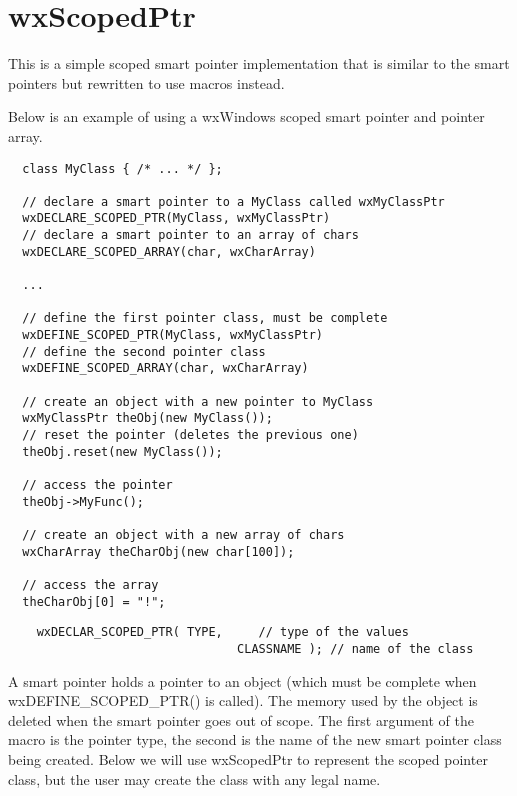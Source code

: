 \section{wxScopedPtr}\label{wxscopedptr}

This is a simple scoped smart pointer implementation that is similar to 
the  smart pointers but rewritten to
use macros instead.


Below is an example of using a wxWindows scoped smart pointer and 
pointer array.

\begin{verbatim}
  class MyClass { /* ... */ };

  // declare a smart pointer to a MyClass called wxMyClassPtr
  wxDECLARE_SCOPED_PTR(MyClass, wxMyClassPtr)
  // declare a smart pointer to an array of chars
  wxDECLARE_SCOPED_ARRAY(char, wxCharArray)

  ...

  // define the first pointer class, must be complete
  wxDEFINE_SCOPED_PTR(MyClass, wxMyClassPtr)
  // define the second pointer class
  wxDEFINE_SCOPED_ARRAY(char, wxCharArray)

  // create an object with a new pointer to MyClass
  wxMyClassPtr theObj(new MyClass());
  // reset the pointer (deletes the previous one)
  theObj.reset(new MyClass());

  // access the pointer
  theObj->MyFunc();

  // create an object with a new array of chars
  wxCharArray theCharObj(new char[100]);

  // access the array
  theCharObj[0] = "!";
\end{verbatim}


\begin{verbatim}
    wxDECLAR_SCOPED_PTR( TYPE,     // type of the values
                                CLASSNAME ); // name of the class
\end{verbatim}

A smart pointer holds a pointer to an object (which must be complete
when wxDEFINE_SCOPED_PTR() is called). The memory used by the object is
deleted when the smart pointer goes out of scope. The first argument
of the macro is the pointer type, the second is the name of the new
smart pointer class being created.  Below we will use wxScopedPtr to
represent the scoped pointer class, but the user may create the class with any
legal name.

